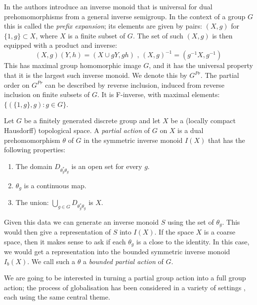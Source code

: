 \begin{example}
In \cite{MR745358,MR2221438} the authors introduce an inverse monoid that is universal for dual prehomomorphisms from a general inverse semigroup. In the context of a group $G$ this is called the \textit{prefix expansion}; its elements are given by pairs: $(X,g)$ for $\lbrace 1,g\rbrace \subset X$, where $X$ is a finite subset of $G$. The set of such $(X,g)$ is then equipped with a product and inverse:
\begin{equation*}
(X,g)(Y,h) = (X\cup gY,gh)\mbox{ , } (X,g)^{-1}=(g^{-1}X,g^{-1})
\end{equation*}
This has maximal group homomorphic image $G$, and it has the universal property that it is the largest such inverse monoid. We denote this by $G^{Pr}$. The partial order on $G^{Pr}$ can be described by reverse inclusion, induced from reverse inclusion on finite subsets of $G$. It is F-inverse, with maximal elements: $\lbrace(\lbrace 1,g \rbrace, g):g \in G \rbrace$.
\end{example}

\begin{definition}
Let $G$ be a finitely generated discrete group and let $X$ be a (locally compact Hausdorff) topological space. A \textit{partial action} of $G$ on $X$ is a dual prehomomorphism $\theta$ of $G$ in the symmetric inverse monoid $I(X)$ that has the following properties:
\begin{enumerate}
\item The domain $D_{\theta_{g}^{*}\theta_{g}}$ is an open set for every $g$.
\item $\theta_{g}$ is a continuous map.
\item The union: $\bigcup_{g \in G}D_{\theta_{g}^{*}\theta_{g}}$ is $X$.
\end{enumerate}
\end{definition}

Given this data we can generate an inverse monoid $S$ using the set of $\theta_{g}$. This would then give a representation of $S$ into $I(X)$. If the space $X$ is a coarse space, then it makes sense to ask if each $\theta_{g}$ is a close to the identity. In this case, we would get a representation into the bounded symmetric inverse monoid $I_{b}(X)$. We call such a $\theta$ a \textit{bounded partial action} of $G$.

We are going to be interested in turning a partial group action into a full group action; the process of globalisation has been considered in a variety of settings \cite{MR0160848, MR1798993, MR2041539, MR2419858, MR1900993, Milan-Steinberg}, each using the same central theme.

